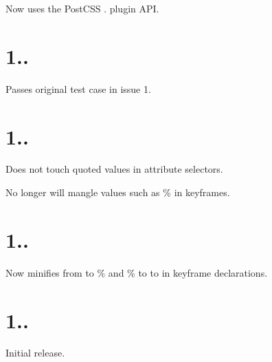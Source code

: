 \begin{DoxyItemize}
\item Now uses the Post\+C\+SS {.} plugin A\+PI.
\end{DoxyItemize}

\section*{1..}


\begin{DoxyItemize}
\item Passes original test case in issue 1.
\end{DoxyItemize}

\section*{1..}


\begin{DoxyItemize}
\item Does not touch quoted values in attribute selectors.
\item No longer will mangle values such as {\%} in keyframes.
\end{DoxyItemize}

\section*{1..}


\begin{DoxyItemize}
\item Now minifies {\ttfamily from} to {\%} and {\%} to {\ttfamily to} in keyframe declarations.
\end{DoxyItemize}

\section*{1..}


\begin{DoxyItemize}
\item Initial release. 
\end{DoxyItemize}